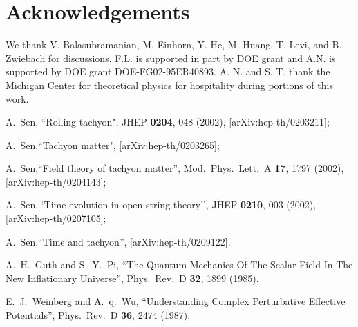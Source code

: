 \documentclass[a4paper,12pt]{article}
\begin{document}
\section*{Acknowledgements}
We thank V. Balasubramanian, M. Einhorn, Y. He, M. Huang, T. Levi, and B. Zwiebach for 
discussions. F.L. is supported in part by DOE grant and 
A.N. is supported by DOE grant DOE-FG02-95ER40893.
A. N. and S. T. thank the Michigan Center for theoretical physics for hospitality during 
portions of this work.


\begin{thebibliography}{99}

A.~Sen,
``Rolling tachyon",
JHEP {\bf 0204}, 048 (2002),
[arXiv:hep-th/0203211];

A.~Sen,``Tachyon matter",
[arXiv:hep-th/0203265];

A.~Sen,``Field theory of tachyon matter'',
Mod.\ Phys.\ Lett.\ A {\bf 17}, 1797 (2002),
[arXiv:hep-th/0204143];


A.~Sen,
`Time evolution in open string theory'',
JHEP {\bf 0210}, 003 (2002),
[arXiv:hep-th/0207105];

A.~Sen,``Time and tachyon'',
[arXiv:hep-th/0209122].




A.~H.~Guth and S.~Y.~Pi,
``The Quantum Mechanics Of The Scalar Field In The New Inflationary Universe'',
Phys.\ Rev.\ D {\bf 32}, 1899 (1985).

E.~J.~Weinberg and A.~q.~Wu,
``Understanding Complex Perturbative Effective Potentials'',
Phys.\ Rev.\ D {\bf 36}, 2474 (1987).


\end{thebibliography}
\end{document}
